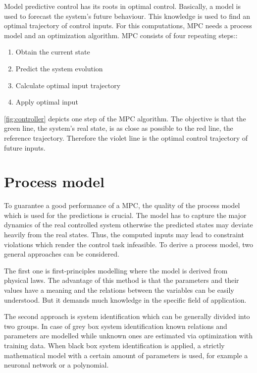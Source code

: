 Model predictive control has its roots in optimal control. Basically, a model is used to forecast the system's future behaviour. This knowledge is used to find an optimal trajectory of control inputs. For this computations, MPC needs a process model and an optimization algorithm.
MPC consists of four repeating steps::
\begin{enumerate}
	\item Obtain the current state
	\item Predict the system evolution
	\item Calculate optimal input trajectory
	\item Apply optimal input
\end{enumerate}

\cref{fig:controller} depicts one step of the MPC algorithm. The objective is that the green line, the system's real state, is as close as possible to the red line, the reference trajectory. Therefore the violet line is the optimal control trajectory of future inputs.


\section{Process model}
\label{sec:processmodel}

To guarantee a good performance of a MPC, the quality of the process model which is used for the predictions is crucial.
The model has to capture the major dynamics of the real controlled system otherwise the predicted states may deviate heavily from the real states.
Thus, the computed inputs may lead to constraint violations which render the control task infeasible.
To derive a process model, two general approaches can be considered.

The first one is first-principles modelling where the model is derived from physical laws.
The advantage of this method is that the parameters and their values have a meaning and the relations between the variables can be easily understood.
But it demands much knowledge in the specific field of application.

The second approach is system identification which can be generally divided into two groups.
In case of grey box system identification known relations and parameters are modelled while unknown ones are estimated via optimization with training data.
When black box system identification is applied, a strictly mathematical model with a certain amount of parameters is used, for example a neuronal network or a polynomial.


